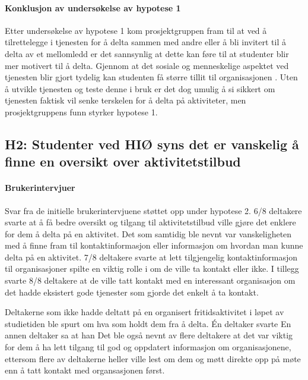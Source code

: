 \paragraph{Konklusjon av undersøkelse av hypotese 1}
Etter undersøkelse av hypotese 1 kom prosjektgruppen fram til at ved å tilrettelegge i tjenesten for å delta sammen med andre eller å bli invitert til å delta av et mellomledd er det sannsynlig at dette kan føre til at studenter blir mer motivert til å delta. Gjennom at det sosiale og menneskelige aspektet ved tjenesten blir gjort tydelig kan studenten få større tillit til organisasjonen \cite{MIDTSUNDSTAD-EPOST:14}. Uten å utvikle tjenesten og teste denne i bruk er det dog umulig å si sikkert om tjenesten faktisk vil senke terskelen for å delta på aktiviteter, men prosjektgruppens funn styrker hypotese 1.

\subsection{H2: Studenter ved HIØ syns det er vanskelig å finne en oversikt over aktivitetstilbud}

\paragraph{Brukerintervjuer}
Svar fra de initielle brukerintervjuene støttet opp under hypotese 2. 6/8 deltakere svarte at å få bedre oversikt og tilgang til aktivitetstilbud ville gjøre det enklere for dem å delta på en aktivitet. Det som samtidig ble nevnt var vanskeligheten med å finne fram til kontaktinformasjon eller informasjon om hvordan man kunne delta på en aktivitet. 7/8 deltakere svarte at lett tilgjengelig kontaktinformasjon til organisasjoner spilte en viktig rolle i om de ville ta kontakt eller ikke. I tillegg svarte 8/8 deltakere at de ville tatt kontakt med en interessant organisasjon om det hadde eksistert gode tjenester som gjorde det enkelt å ta kontakt.

Deltakerne som ikke hadde deltatt på en organisert fritidsaktivitet i løpet av studietiden ble spurt om hva som holdt dem fra å delta. Én deltaker svarte  En annen deltaker sa at han  Det ble også nevnt av flere deltakere at det var viktig for dem å ha lett tilgang til god og oppdatert informasjon om organisasjonene, ettersom flere av deltakerne heller ville lest om dem og møtt direkte opp på møte enn å tatt kontakt med organsasjonen først.

